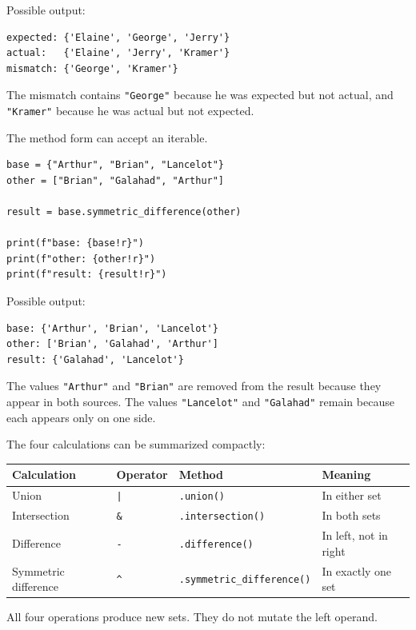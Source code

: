 Possible output:

\begin{verbatim}
expected: {'Elaine', 'George', 'Jerry'}
actual:   {'Elaine', 'Jerry', 'Kramer'}
mismatch: {'George', 'Kramer'}
\end{verbatim}

The mismatch contains \texttt{"George"} because he was expected but not actual, and \texttt{"Kramer"} because he was actual but not expected.

The method form can accept an iterable.

\begin{verbatim}
base = {"Arthur", "Brian", "Lancelot"}
other = ["Brian", "Galahad", "Arthur"]

result = base.symmetric_difference(other)

print(f"base: {base!r}")
print(f"other: {other!r}")
print(f"result: {result!r}")
\end{verbatim}

Possible output:

\begin{verbatim}
base: {'Arthur', 'Brian', 'Lancelot'}
other: ['Brian', 'Galahad', 'Arthur']
result: {'Galahad', 'Lancelot'}
\end{verbatim}

The values \texttt{"Arthur"} and \texttt{"Brian"} are removed from the result because they appear in both sources. The values \texttt{"Lancelot"} and \texttt{"Galahad"} remain because each appears only on one side.

The four calculations can be summarized compactly:

\begin{center}
\begin{tabular}{llll}
\textbf{Calculation} & \textbf{Operator} & \textbf{Method} & \textbf{Meaning} \\
\hline
Union & \texttt{|} & \texttt{.union()} & In either set \\
Intersection & \texttt{\&} & \texttt{.intersection()} & In both sets \\
Difference & \texttt{-} & \texttt{.difference()} & In left, not in right \\
Symmetric difference & \texttt{\textasciicircum{}} & \texttt{.symmetric\_difference()} & In exactly one set \\
\end{tabular}
\end{center}

All four operations produce new sets. They do not mutate the left operand.

